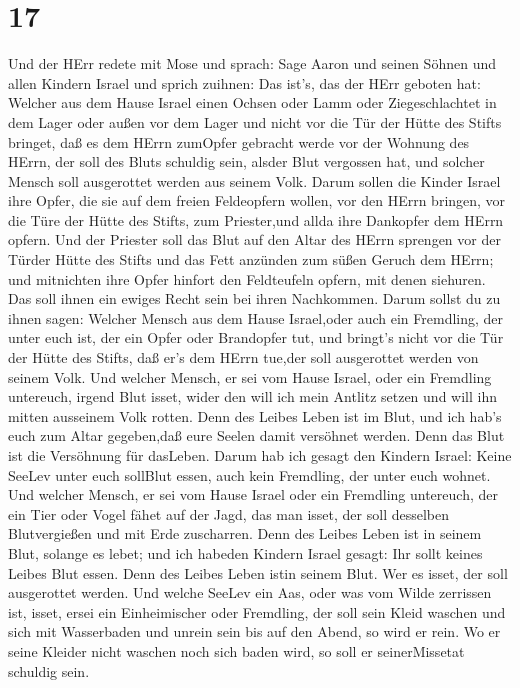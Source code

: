 \hypertarget{section-16}{%
\section{17}\label{section-16}}

 Und der HErr redete mit Mose und sprach:  Sage
Aaron und seinen Söhnen und allen Kindern Israel und sprich zuihnen: Das
ist's, das der HErr geboten hat:  Welcher aus dem Hause
Israel einen Ochsen oder Lamm oder Ziegeschlachtet in dem Lager oder
außen vor dem Lager  und nicht vor die Tür der Hütte des
Stifts bringet, daß es dem HErrn zumOpfer gebracht werde vor der Wohnung
des HErrn, der soll des Bluts schuldig sein, alsder Blut vergossen hat,
und solcher Mensch soll ausgerottet werden aus seinem Volk. 
Darum sollen die Kinder Israel ihre Opfer, die sie auf dem freien
Feldeopfern wollen, vor den HErrn bringen, vor die Türe der Hütte des
Stifts, zum Priester,und allda ihre Dankopfer dem HErrn opfern.
 Und der Priester soll das Blut auf den Altar des HErrn
sprengen vor der Türder Hütte des Stifts und das Fett anzünden zum süßen
Geruch dem HErrn;  und mitnichten ihre Opfer hinfort den
Feldteufeln opfern, mit denen siehuren. Das soll ihnen ein ewiges Recht
sein bei ihren Nachkommen.  Darum sollst du zu ihnen sagen:
Welcher Mensch aus dem Hause Israel,oder auch ein Fremdling, der unter
euch ist, der ein Opfer oder Brandopfer tut,  und bringt's
nicht vor die Tür der Hütte des Stifts, daß er's dem HErrn tue,der soll
ausgerottet werden von seinem Volk.  Und welcher Mensch, er
sei vom Hause Israel, oder ein Fremdling untereuch, irgend Blut isset,
wider den will ich mein Antlitz setzen und will ihn mitten ausseinem
Volk rotten.  Denn des Leibes Leben ist im Blut, und ich
hab's euch zum Altar gegeben,daß eure Seelen damit versöhnet werden.
Denn das Blut ist die Versöhnung für dasLeben.  Darum hab
ich gesagt den Kindern Israel: Keine SeeLev unter euch sollBlut essen,
auch kein Fremdling, der unter euch wohnet.  Und welcher
Mensch, er sei vom Hause Israel oder ein Fremdling untereuch, der ein
Tier oder Vogel fähet auf der Jagd, das man isset, der soll desselben
Blutvergießen und mit Erde zuscharren.  Denn des Leibes
Leben ist in seinem Blut, solange es lebet; und ich habeden Kindern
Israel gesagt: Ihr sollt keines Leibes Blut essen. Denn des Leibes Leben
istin seinem Blut. Wer es isset, der soll ausgerottet werden.
 Und welche SeeLev ein Aas, oder was vom Wilde zerrissen
ist, isset, ersei ein Einheimischer oder Fremdling, der soll sein Kleid
waschen und sich mit Wasserbaden und unrein sein bis auf den Abend, so
wird er rein.  Wo er seine Kleider nicht waschen noch sich
baden wird, so soll er seinerMissetat schuldig sein.

